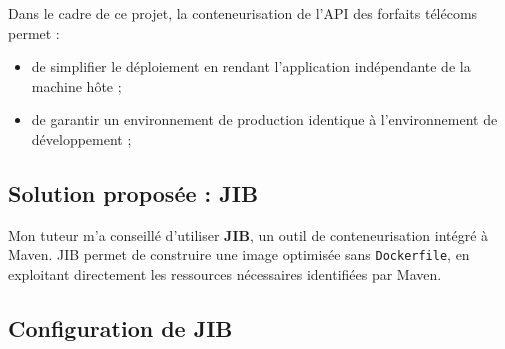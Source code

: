 \documentclass{article}
\begin{document}
	Dans le cadre de ce projet, la conteneurisation de l'API des forfaits télécoms permet :
	\begin{itemize}
		\item de simplifier le déploiement en rendant l'application indépendante de la machine hôte ;
		\item de garantir un environnement de production identique à l'environnement de développement ;
	\end{itemize}
	
	\subsection{Solution proposée : JIB}
	
	Mon tuteur m'a conseillé d'utiliser \textbf{JIB}, un outil de conteneurisation intégré à Maven. JIB permet de construire une image optimisée sans \texttt{Dockerfile}, en exploitant directement les ressources nécessaires identifiées par Maven.
	
	\subsection{Configuration de JIB}
	
\end{document}
